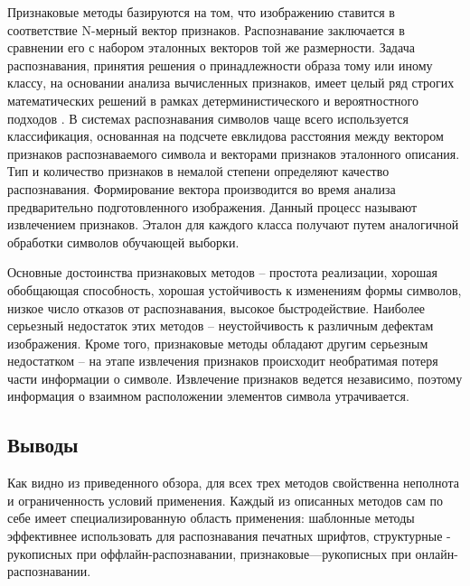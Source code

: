 Признаковые методы базируются на том, что изображению ставится в
соответствие N-мерный вектор признаков. Распознавание заключается в сравнении его
с набором эталонных векторов той же размерности. Задача распознавания, принятия
решения о принадлежности образа тому или иному классу, на основании анализа
вычисленных признаков, имеет целый ряд строгих математических решений в рамках
детерминистического и вероятностного подходов \cite{abramov, duda}. В системах распознавания
символов чаще всего используется классификация, основанная на подсчете евклидова
расстояния между вектором признаков распознаваемого символа и векторами
признаков эталонного описания. Тип и количество признаков в немалой степени
определяют качество распознавания. Формирование вектора производится во время
анализа предварительно подготовленного изображения. Данный процесс называют
извлечением признаков. Эталон для каждого класса получают путем аналогичной
обработки символов обучающей выборки.

Основные достоинства признаковых методов -- простота реализации, хорошая
обобщающая способность, хорошая устойчивость к изменениям формы символов,
низкое число отказов от распознавания, высокое быстродействие. Наиболее серьезный
недостаток этих методов -- неустойчивость к различным дефектам изображения. Кроме
того, признаковые методы обладают другим серьезным недостатком -- на этапе
извлечения признаков происходит необратимая потеря части информации о символе.
Извлечение признаков ведется независимо, поэтому информация о взаимном
расположении элементов символа утрачивается.

\subsection{Выводы}

Как видно из приведенного обзора, для всех трех методов свойственна
неполнота и ограниченность условий применения. Каждый из описанных методов сам
по себе имеет специализированную область применения: шаблонные методы
эффективнее использовать для распознавания печатных шрифтов, структурные -
рукописных при оффлайн-распознавании, признаковые---рукописных при онлайн-
распознавании.

